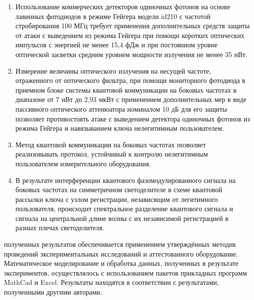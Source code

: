 
{}
\begin{enumerate}
  \item Использование коммерческих детекторов одиночных фотонов на основе лавинных фотодиодов в режиме Гейгера модели id210 с частотой стробирования 100 МГц  требует применения дополнительных средств защиты от атаки с выведением из режима Гейгера при помощи коротких оптических импульсов с энергией не менее 15,4 фДж и при постоянном уровне оптической засветки средним уровнем мощности излучения не менее 35 нВт.  
  \item Измерение величины оптического излучения на несущей частоте, отраженного от оптического фильтра, при помощи мониторного фотодиода в приемном блоке системы квантовой коммуникации на боковых частотах в диапазоне от 7 нВт до 2,93 мкВт с применением дополнительных мер в виде пассивного оптического аттенюатора номиналом 10 дБ для его защиты позволяет противостоять атаке с выведением детектора одиночных фотонов из режима Гейгера и навязыванием ключа нелегитимным пользователем. 
  \item Метод квантовой коммуникации на боковых частотах позволяет реализовывать протокол, устойчивый к контролю нелегитимным пользователем измерительного оборудования. 
  \item В результате интерференции квантового фазомодулированного сигнала на боковых частотах на симметричном светоделителе в схеме квантовой рассылки ключа с узлом регистрации, независящим от легитимного пользователя, происходит спектральное разделение квантового сигнала и сигнала на центральной длине волны с их независимой регистрацией в разных плечах светоделителя. 
\end{enumerate}

{\reliability} полученных результатов обеспечивается применением утверждённых методик проведений экспериментальных исследований и аттестованного оборудование. Математическое моделирование и обработка данных, полученных в результате экспериментов, осуществлялось с использованием пакетов прикладных программ MathCad и Excel. Результаты находятся в соответствии с результатами, полученными другими авторами.


